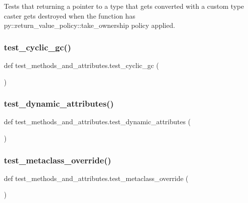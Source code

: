 \begin{DoxyVerb}Tests that returning a pointer to a type that gets converted with a custom type caster gets
destroyed when the function has py::return_value_policy::take_ownership policy applied.\end{DoxyVerb}
 \mbox{\label{namespacetest__methods__and__attributes_a1faeda1dfc6ea96d020984d3822799fa}} 
\subsubsection{\texorpdfstring{test\_cyclic\_gc()}{test\_cyclic\_gc()}}
{\footnotesize\ttfamily def test\+\_\+methods\+\_\+and\+\_\+attributes.\+test\+\_\+cyclic\+\_\+gc (\begin{DoxyParamCaption}{ }\end{DoxyParamCaption})}

\mbox{\label{namespacetest__methods__and__attributes_acdcf26390e4ea57e76566c673689656a}} 
\subsubsection{\texorpdfstring{test\_dynamic\_attributes()}{test\_dynamic\_attributes()}}
{\footnotesize\ttfamily def test\+\_\+methods\+\_\+and\+\_\+attributes.\+test\+\_\+dynamic\+\_\+attributes (\begin{DoxyParamCaption}{ }\end{DoxyParamCaption})}

\mbox{\label{namespacetest__methods__and__attributes_a15fed28f0cd9634faf04e0816893c3a9}} 
\subsubsection{\texorpdfstring{test\_metaclass\_override()}{test\_metaclass\_override()}}
{\footnotesize\ttfamily def test\+\_\+methods\+\_\+and\+\_\+attributes.\+test\+\_\+metaclass\+\_\+override (\begin{DoxyParamCaption}{ }\end{DoxyParamCaption})}

